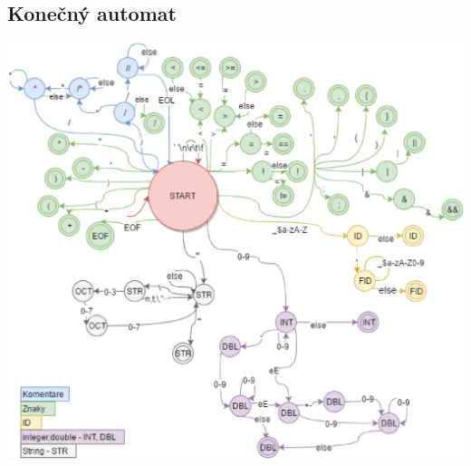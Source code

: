 \documentclass[11pt,a4paper]{article}
\begin{document}
	\subsection{Konečný automat}
	\label{app:automat}
	\begin{center}
		\scalebox{0.9} {\includegraphics{IFJ.eps}}
	\end{center}
	
	
	\newpage
	
\end{document}
